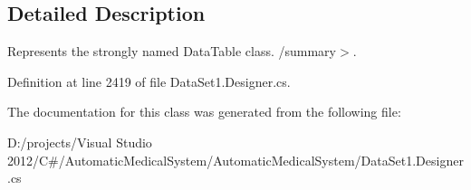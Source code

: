 \subsection{Detailed Description}
Represents the strongly named DataTable class. /summary$>$. 

Definition at line 2419 of file DataSet1.Designer.cs.

The documentation for this class was generated from the following file:\begin{CompactItemize}
\item 
D:/projects/Visual Studio 2012/C\#/AutomaticMedicalSystem/AutomaticMedicalSystem/DataSet1.Designer.cs\end{CompactItemize}

